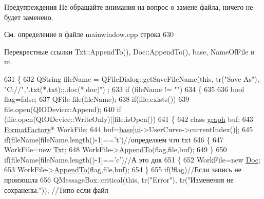 \begin{DoxyWarning}{Предупреждения}
Не обращайте внимания на вопрос о замене файла, ничего не будет заменено. 
\end{DoxyWarning}


См. определение в файле mainwindow.\+cpp строка 630



Перекрестные ссылки Txt\+::\+Append\+To(), Doc\+::\+Append\+To(), base, Name\+Of\+File и ui.


\begin{DoxyCode}
631 \{
632     QString fileName = QFileDialog::getSaveFileName(\textcolor{keyword}{this}, tr(\textcolor{stringliteral}{"Save As"}), \textcolor{stringliteral}{"C://"},\textcolor{stringliteral}{".txt(*.txt);;.doc(*.doc)"})
      ;
633     \textcolor{keywordflow}{if} (fileName != \textcolor{stringliteral}{""})
634     \{
635 
636         \textcolor{keywordtype}{bool} flag=\textcolor{keyword}{false};
637         QFile file(fileName);
638         \textcolor{keywordflow}{if}(file.exists())
639             file.open(QIODevice::Append);
640         \textcolor{keywordflow}{if} (file.open(QIODevice::WriteOnly)||file.isOpen())
641         \{
642             \textcolor{keyword}{class }\hyperlink{classgraph}{graph} buf;
643             \hyperlink{class_format_factory}{FormatFactory}* WorkFile;
644             buf=\hyperlink{class_main_window_a3413d4508f4981518b1b8ebf3b29121e}{base}[\hyperlink{class_main_window_a35466a70ed47252a0191168126a352a5}{ui}->UserCurve->currentIndex()];
645             \textcolor{keywordflow}{if}(fileName[fileName.length()-1]==\textcolor{charliteral}{'t'})\textcolor{comment}{//определяем что txt}
646             \{
647                 WorkFile=\textcolor{keyword}{new} \hyperlink{class_txt}{Txt};
648                 WorkFile->\hyperlink{class_txt_a4d23910d9b7f36e4f82fdf6045135378}{AppendTo}(flag,file,buf);
649             \}
650             \textcolor{keywordflow}{if}(fileName[fileName.length()-1]==\textcolor{charliteral}{'c'})\textcolor{comment}{//А это док}
651             \{
652                 WorkFile=\textcolor{keyword}{new} \hyperlink{class_doc}{Doc};
653                 WorkFile->\hyperlink{class_doc_af5c9529b9108d9155b0d725f066b3d67}{AppendTo}(flag,file,buf);
654             \}
655             \textcolor{keywordflow}{if}(!flag)\textcolor{comment}{//Если запись не произошла}
656                 QMessageBox::critical(\textcolor{keyword}{this}, tr(\textcolor{stringliteral}{"Error"}), tr(\textcolor{stringliteral}{"Изменения не сохранены."})); \textcolor{comment}{//Типо если файл
}
\end{DoxyCode}
